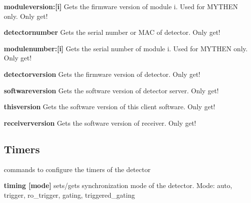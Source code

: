 \begin{DoxyItemize}
\item {\bfseries moduleversion:\mbox{[}i\mbox{]}} Gets the firmware version of module i. Used for MYTHEN only. Only get!
\end{DoxyItemize}


\begin{DoxyItemize}
\item {\bfseries detectornumber} Gets the serial number or MAC of detector. Only get!
\end{DoxyItemize}


\begin{DoxyItemize}
\item {\bfseries modulenumber:\mbox{[}i\mbox{]}} Gets the serial number of module i. Used for MYTHEN only. Only get!
\end{DoxyItemize}


\begin{DoxyItemize}
\item {\bfseries detectorversion} Gets the firmware version of detector. Only get!
\end{DoxyItemize}


\begin{DoxyItemize}
\item {\bfseries softwareversion} Gets the software version of detector server. Only get!
\end{DoxyItemize}


\begin{DoxyItemize}
\item {\bfseries thisversion} Gets the software version of this client software. Only get!
\end{DoxyItemize}


\begin{DoxyItemize}
\item {\bfseries receiverversion} Gets the software version of receiver. Only get!
\end{DoxyItemize}\hypertarget{config_configtimers}{}\subsection{Timers}\label{config_configtimers}
commands to configure the timers of the detector


\begin{DoxyItemize}
\item {\bfseries timing \mbox{[}mode\mbox{]}} sets/gets synchronization mode of the detector. Mode: auto, trigger, ro\_\-trigger, gating, triggered\_\-gating
\end{DoxyItemize}


